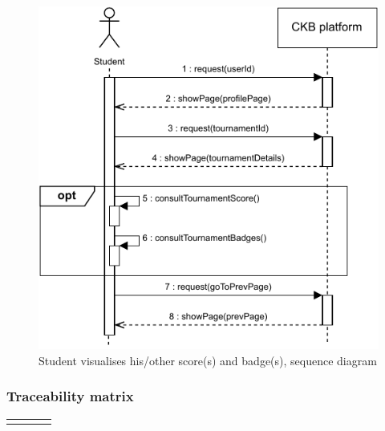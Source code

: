 \documentclass{article}
\begin{document}
{\begin{enumerate}
          \begin{figure}[H]
              \centering
              \includegraphics[scale=0.95]{images/SequenceDiagrams/Sequence13.pdf}
              \caption{Student visualises his/other score(s) and badge(s), sequence diagram}
              \label{fig:ScoresBadgesVisualizationSeqDiagram}
          \end{figure}
\end{enumerate}
\subsubsection{Traceability matrix}
\begin{xltabular}{\textwidth}
    {| >{\raggedright\arraybackslash}g | >{\raggedright\arraybackslash}X | >{\raggedright\arraybackslash}X | >{\raggedright\arraybackslash}X |}
    \hline
    \endfirsthead
    \hline
    \endhead
    \endfoot
    \hline
    \endlastfoot


\end{xltabular}}
\end{document}
